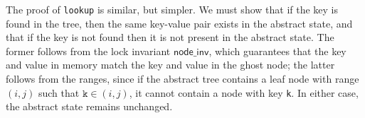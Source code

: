 \documentclass[runningheads]{llncs}
\begin{document}

The proof of \lstinline{lookup} is similar, but simpler. We must show that if the key is found in the tree, then the same key-value pair exists in the abstract state, and that if the key is not found then it is not present in the abstract state. The former follows from the lock invariant $\mathsf{node\_inv}$, which guarantees that the key and value in memory match the key and value in the ghost node; the latter follows from the ranges, since if the abstract tree contains a leaf node with range $(i, j)$ such that $\texttt{k} \in (i, j)$, it cannot contain a node with key \lstinline{k}. In either case, the abstract state remains unchanged.
\end{document}
